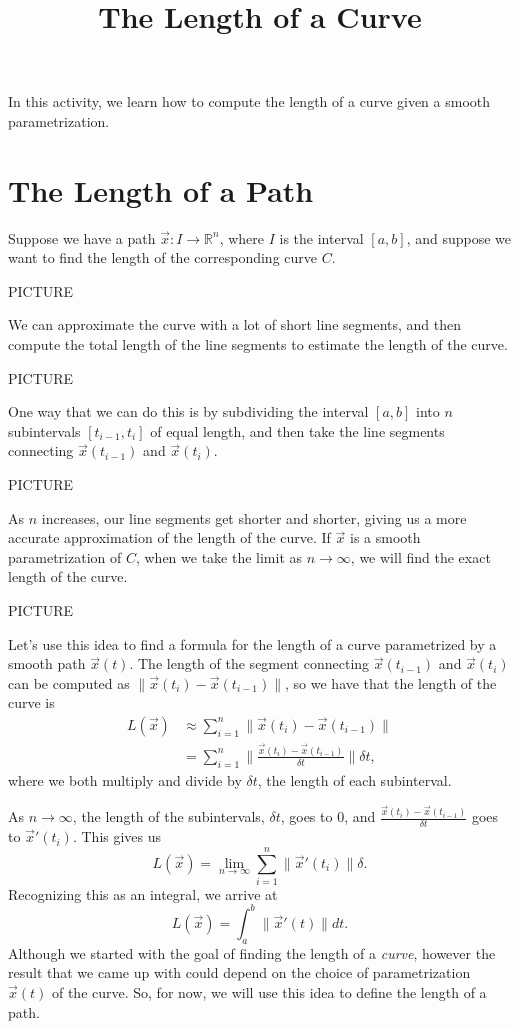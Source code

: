 \documentclass{ximera}
\title{The Length of a Curve}
\begin{document}
\begin{abstract}
\end{abstract}
\maketitle

In this activity, we learn how to compute the length of a curve given a smooth parametrization.

\section*{The Length of a Path}

Suppose we have a path $\vec{x}:I\rightarrow\mathbb{R}^n$, where $I$ is the interval $[a,b]$, and suppose we want to find the length of the corresponding curve $C$.

PICTURE

We can approximate the curve with a lot of short line segments, and then compute the total length of the line segments to estimate the length of the curve.

PICTURE

One way that we can do this is by subdividing the interval $[a,b]$ into $n$ subintervals $[t_{i-1},t_i]$ of equal length, and then take the line segments connecting $\vec{x}(t_{i-1})$ and $\vec{x}(t_i)$.

PICTURE

As $n$ increases, our line segments get shorter and shorter, giving us a more accurate approximation of the length of the curve. If $\vec{x}$ is a smooth parametrization of $C$, when we take the limit as $n\rightarrow\infty$, we will find the exact length of the curve.

PICTURE

Let's use this idea to find a formula for the length of a curve parametrized by a smooth path $\vec{x}(t)$. The length of the segment connecting $\vec{x}(t_{i-1})$ and $\vec{x}(t_i)$ can be computed as $\|\vec{x}(t_i)-\vec{x}(t_{i-1})\|$, so we have that the length of the curve is
\begin{align*}
L(\vec{x}) &\approx \sum_{i=1}^n\|\vec{x}(t_i)-\vec{x}(t_{i-1})\|\\
&=\sum_{i=1}^n\|\frac{\vec{x}(t_i)-\vec{x}(t_{i-1})}{\delta t}\|\delta t,
\end{align*}
where we both multiply and divide by $\delta t$, the length of each subinterval.

As $n\rightarrow \infty$, the length of the subintervals, $\delta t$, goes to $0$, and $\frac{\vec{x}(t_i)-\vec{x}(t_{i-1})}{\delta t}$ goes to $\vec{x}'(t_i)$. This gives us
\[
L(\vec{x})=\lim_{n\rightarrow\infty}\sum_{i=1}^n \|\vec{x}'(t_i)\|\delta.
\]
Recognizing this as an integral, we arrive at
\[
L(\vec{x}) = \int_a^b\|\vec{x}'(t)\|dt.
\]
Although we started with the goal of finding the length of a \emph{curve}, however the result that we came up with could depend on the choice of parametrization $\vec{x}(t)$ of the curve. So, for now, we will use this idea to define the length of a path.
\end{document}
